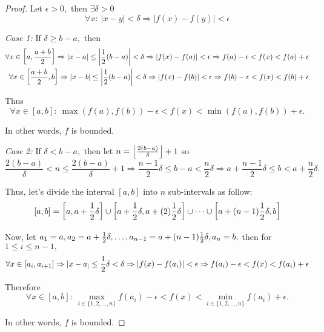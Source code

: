 \documentclass{article}
\begin{document}
\begin{proof}
    Let $\epsilon > 0,$ then $\exists \delta > 0$
    \[
        \forall x:\ |x-y| < \delta \Rightarrow |f(x) - f(y)| < \epsilon
    \]

    \textit{Case 1:} If $\delta \ge b-a,$ then
    \[
        \begin{aligned}
            \forall x \in \left[a, \frac{a+b}{2} \right] \Rightarrow |x-a| \le \left| \frac{1}{2}(b-a) \right| < \delta \Rightarrow |f(x) - f(a)| < \epsilon \Rightarrow f(a) - \epsilon < f(x) < f(a) + \epsilon\\
            \forall x \in \left[\frac{a+b}{2}, b \right] \Rightarrow |x-b| \le \left| \frac{1}{2}(b-a) \right| < \delta \Rightarrow |f(x) - f(b)| < \epsilon \Rightarrow f(b) - \epsilon < f(x) < f(b) + \epsilon\\
        \end{aligned}
    \]
    
    Thus 
    \[
        \forall x \in [a, b]:\ \max(f(a), f(b)) - \epsilon < f(x) < \min(f(a), f(b)) + \epsilon.
    \]

    In other words, $f$ is bounded.

    \textit{Case 2:} If $\delta < b-a,$ then let $n = \left\lfloor \frac{2(b-a)}{\delta} \right\rfloor + 1$ so
    \[
        \frac{2(b-a)}{\delta} < n \le \frac{2(b-a)}{\delta} + 1 \Rightarrow \frac{n-1}{2}\delta \le b-a < \frac{n}{2}\delta
        \Rightarrow a + \frac{n-1}{2}\delta \le b < a + \frac{n}{2}\delta.
    \]
    
    Thus, let's divide the interval $[a, b]$ into $n$ sub-intervals as follow:
    \[
        [a, b] = \left[ a, a + \frac{1}{2}\delta \right] \cup \left[ a + \frac{1}{2}\delta, a + (2)\frac{1}{2}\delta \right] \cup \cdots \cup \left[ a + (n-1)\frac{1}{2}\delta, b \right]
    \]

    Now, let $a_1 = a, a_2 = a + \frac{1}{2}\delta, \ldots, a_{n-1} = a + (n-1)\frac{1}{2}\delta, a_n = b,$ then for $1 \le i \le n-1,$
    \[
        \forall x \in \left[ a_i, a_{i+1} \right] \Rightarrow |x-a_| \le \frac{1}{2}\delta < \delta \Rightarrow |f(x) - f(a_i)| < \epsilon \Rightarrow f(a_i) - \epsilon < f(x) < f(a_i) + \epsilon
    \]

    Therefore
    \[
        \forall x \in [a, b]:\ \max_{i \in \{1,2,\ldots, n\}} f(a_i) - \epsilon < f(x) < \min_{i \in \{1,2,\ldots, n\}} f(a_i) + \epsilon.
    \]
    
    In other words, $f$ is bounded.
\end{proof}

\newpage
\end{document}
